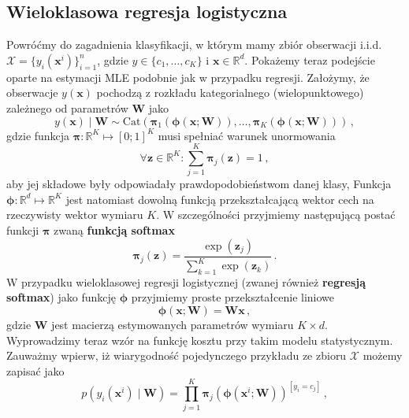 \documentclass{myclass}
\numberwithin{equation}{subsection}
\begin{document}
\subsection{Wieloklasowa regresja logistyczna}

Powróćmy do zagadnienia klasyfikacji, w którym mamy zbiór obserwacji i.i.d. \(\mathcal{X} =
\{y_i(\mathbf{x}^i)\}_{i=1}^n\), gdzie \(y \in \{c_1,\ldots,c_K\}\) i \(\mathbf{x} \in
\mathbb{R}^d\). Pokażemy teraz podejście oparte na estymacji MLE podobnie jak w przypadku regresji.
Założymy, że obserwacje \(y(\mathbf{x})\) pochodzą z rozkładu kategorialnego (wielopunktowego)
zależnego od parametrów \(\mathbf{W}\) jako
\begin{equation}
    y(\mathbf{x}) \mid \mathbf{W} \sim \mathrm{Cat}(\boldsymbol{\pi}_1(\boldsymbol{\phi}(\mathbf{x}; \mathbf{W})), \ldots, \boldsymbol{\pi}_K(\boldsymbol{\phi}(\mathbf{x}; \mathbf{W})))\,,
\end{equation}
gdzie funkcja \(\boldsymbol{\pi}: \mathbb{R}^K \mapsto [0;1]^K\) musi spełniać warunek unormowania
\begin{equation*}
    \forall \mathbf{z}\in\mathbb{R}^K: \sum_{j=1}^K \boldsymbol{\pi}_j(\mathbf{z}) = 1\,,
\end{equation*}
aby jej składowe były odpowiadały prawdopodobieństwom danej klasy, Funkcja \(\boldsymbol{\phi}:
\mathbb{R}^d \mapsto \mathbb{R}^K\) jest natomiast dowolną funkcją przekształcającą wektor cech na
rzeczywisty wektor wymiaru \(K\). W szczególności przyjmiemy następującą postać funkcji
\(\boldsymbol{\pi}\) zwaną \textbf{funkcją softmax}
\begin{equation}\boxed{
    \boldsymbol{\pi}_j(\mathbf{z}) = \frac{\exp\left(\mathbf{z}_j\right)}{\sum_{k=1}^K \exp\left(\mathbf{z}_k\right)}\,.
}\end{equation}
W przypadku wieloklasowej regresji logistycznej (zwanej również \textbf{regresją softmax}) jako
funkcję \(\boldsymbol{\phi}\) przyjmiemy proste przekształcenie liniowe
\begin{equation}
    \boldsymbol{\phi}(\mathbf{x}; \mathbf{W}) = \mathbf{W}\mathbf{x}\,,
\end{equation} 
gdzie \(\mathbf{W}\) jest macierzą estymowanych parametrów wymiaru \(K \times d\). Wyprowadzimy
teraz wzór na funkcję kosztu przy takim modelu statystycznym. Zauważmy wpierw, iż wiarygodność
pojedynczego przykładu ze zbioru \(\mathcal{X}\) możemy zapisać jako
\begin{equation}
    p(y_i(\mathbf{x}^i) \mid \mathbf{W}) = \prod_{j=1}^K \boldsymbol{\pi}_j\left(\boldsymbol{\phi}(\mathbf{x}^i; \mathbf{W})\right)^{[y_i = c_j]}\,,
\end{equation}
\end{document}
